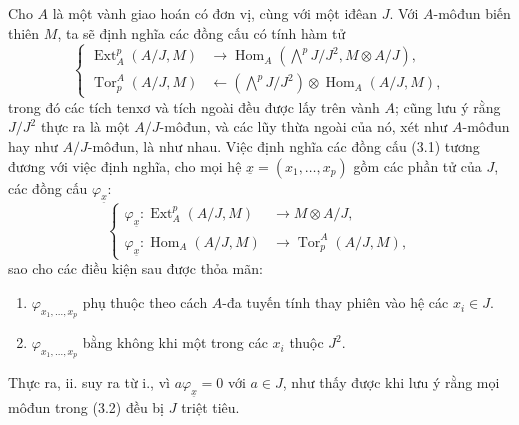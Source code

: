 Cho $A$ là một vành giao hoán có đơn vị, cùng với một iđêan $J$. Với
$A$-môđun biến thiên $M$, ta sẽ định nghĩa các đồng cấu có tính hàm tử
\begin{equation}\tag{3.1}
\left\{
\begin{aligned}
\operatorname{Ext}_{A}^{p}(A/J,M)
  &\longrightarrow
  \operatorname{Hom}_{A}\!\left(\bigwedge^{p}J/J^{2},M\otimes A/J\right),\\
\operatorname{Tor}_{p}^{A}(A/J,M)
  &\longleftarrow
  \left(\bigwedge^{p}J/J^{2}\right)
  \otimes\operatorname{Hom}_{A}(A/J,M),
\end{aligned}
\right.
\end{equation}
trong đó các tích tenxơ và tích ngoài đều được lấy trên vành $A$; cũng lưu ý
rằng $J/J^{2}$ thực ra là một $A/J$-môđun, và các lũy thừa
ngoài của nó, xét như $A$-môđun hay như $A/J$-môđun, là như nhau.
Việc định nghĩa các đồng cấu (3.1) tương đương với việc định nghĩa, cho mọi
hệ $\underline{x}=(x_1,\ldots,x_p)$ gồm các phần tử của $J$, các đồng cấu
$\varphi_{\underline{x}}$:
\begin{equation}\tag{3.2}
\left\{
\begin{aligned}
\varphi_{\underline{x}}:
  \operatorname{Ext}_{A}^{p}(A/J,M)&\longrightarrow M\otimes A/J,\\
\varphi_{\underline{x}}:
  \operatorname{Hom}_{A}(A/J,M)&\longrightarrow
  \operatorname{Tor}_{p}^{A}(A/J,M),
\end{aligned}
\right.
\end{equation}
sao cho các điều kiện sau được thỏa mãn:

\begin{enumerate}
\item[\textup{i.}] $\varphi_{x_1,\ldots,x_p}$ phụ thuộc theo cách
$A$-đa tuyến tính thay phiên vào hệ các $x_i\in J$.
\item[\textup{ii.}] $\varphi_{x_1,\ldots,x_p}$ bằng không khi một trong các $x_i$ thuộc
$J^{2}$.
\end{enumerate}
Thực ra, ii. suy ra từ i., vì $a\varphi_{\underline{x}}=0$ với $a\in J$,
như thấy được khi lưu ý rằng mọi môđun trong (3.2) đều bị
$J$ triệt tiêu.

